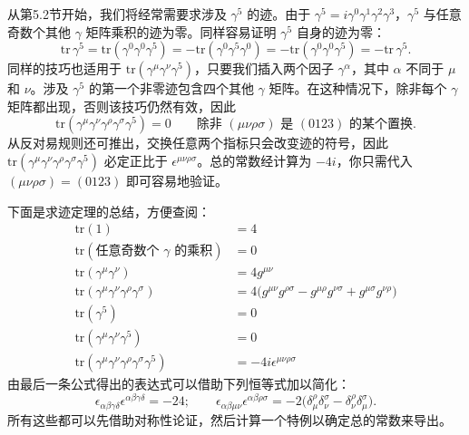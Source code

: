 从第5.2节开始，我们将经常需要求涉及 $\gamma^5$ 的迹。由于 $\gamma^5 = i\gamma^0\gamma^1\gamma^2\gamma^3$，$\gamma^5$ 与任意奇数个其他 $\gamma$ 矩阵乘积的迹为零。同样容易证明 $\gamma^5$ 自身的迹为零：
\begin{equation}
  \mathrm{tr}\,\gamma^5 = \mathrm{tr}(\gamma^0\gamma^0\gamma^5)
    = -\mathrm{tr}(\gamma^0\gamma^5\gamma^0)
    = -\mathrm{tr}(\gamma^0\gamma^0\gamma^5) = -\mathrm{tr}\,\gamma^5 .
\end{equation}
同样的技巧也适用于 $\mathrm{tr}(\gamma^\mu\gamma^\nu\gamma^5)$，只要我们插入两个因子 $\gamma^\alpha$，其中 $\alpha$ 不同于 $\mu$ 和 $\nu$。涉及 $\gamma^5$ 的第一个非零迹包含四个其他 $\gamma$ 矩阵。在这种情况下，除非每个 $\gamma$ 矩阵都出现，否则该技巧仍然有效，因此
\begin{equation}
  \mathrm{tr}(\gamma^\mu\gamma^\nu\gamma^\rho\gamma^\sigma\gamma^5) = 0
  \qquad\text{除非 } (\mu\nu\rho\sigma) \text{ 是 }
    (0123) \text{ 的某个置换}.
\end{equation}
从反对易规则还可推出，交换任意两个指标只会改变迹的符号，因此 $\mathrm{tr}(\gamma^\mu\gamma^\nu\gamma^\rho\gamma^\sigma\gamma^5)$ 必定正比于 $\epsilon^{\mu\nu\rho\sigma}$。总的常数经计算为 $-4i$，你只需代入 $(\mu\nu\rho\sigma) = (0123)$ 即可容易地验证。

下面是求迹定理的总结，方便查阅：
\begin{equation}
  \begin{aligned}
    \mathrm{tr}(1) &= 4\\
    \mathrm{tr}(\text{任意奇数个 }\gamma\text{ 的乘积}) &= 0\\
    \mathrm{tr}(\gamma^\mu\gamma^\nu) &= 4g^{\mu\nu}\\
    \mathrm{tr}(\gamma^\mu\gamma^\nu\gamma^\rho\gamma^\sigma)
      &= 4\bigl( g^{\mu\nu}g^{\rho\sigma} - g^{\mu\rho}g^{\nu\sigma}
        + g^{\mu\sigma}g^{\nu\rho} \bigr)\\
    \mathrm{tr}(\gamma^5) &= 0\\
    \mathrm{tr}(\gamma^\mu\gamma^\nu\gamma^5) &= 0\\
    \mathrm{tr}(\gamma^\mu\gamma^\nu\gamma^\rho\gamma^\sigma\gamma^5)
      &= -4i\epsilon^{\mu\nu\rho\sigma}
  \end{aligned}
  \label{eq:5.5}
\end{equation}
由最后一条公式得出的表达式可以借助下列恒等式加以简化：
\begin{equation}
  \epsilon_{\alpha\beta\gamma\delta}\epsilon^{\alpha\beta\gamma\delta}
    = -24;\qquad
  \epsilon_{\alpha\beta\mu\nu}\epsilon^{\alpha\beta\rho\sigma}
    = -2\bigl( \delta^\rho_\mu\delta^\sigma_\nu
      - \delta^\rho_\nu\delta^\sigma_\mu \bigr) .
  \label{eq:5.6}
\end{equation}
所有这些都可以先借助对称性论证，然后计算一个特例以确定总的常数来导出。

